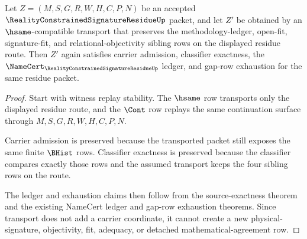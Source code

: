 \begin{theorem}
\label{thm:reality-constrained-signature-residue-transport-closure}
Let $Z=(M,S,G,R,W,H,C,P,N)$ be an accepted
$\RealityConstrainedSignatureResidueUp$ packet, and let $Z'$ be obtained by an
$\hsame$-compatible transport that preserves the methodology-ledger, open-fit,
signature-fit, and relational-objectivity sibling rows on the displayed residue
route. Then $Z'$ again satisfies carrier admission, classifier exactness, the
$\NameCert_{\RealityConstrainedSignatureResidueUp}$ ledger, and gap-row
exhaustion for the same residue packet.
\end{theorem}
\begin{proof}
Start with witness replay stability. The $\hsame$ row transports only the
displayed residue route, and the $\Cont$ row replays the same continuation
surface through $M,S,G,R,W,H,C,P,N$.

Carrier admission is preserved because the transported packet still exposes the
same finite $\BHist$ rows. Classifier exactness is preserved because the
classifier compares exactly those rows and the assumed transport keeps the four
sibling rows on the route.

The ledger and exhaustion claims then follow from the source-exactness theorem
and the existing NameCert ledger and gap-row exhaustion theorems. Since transport
does not add a carrier coordinate, it cannot create a new physical-signature,
objectivity, fit, adequacy, or detached mathematical-agreement row.
\end{proof}


